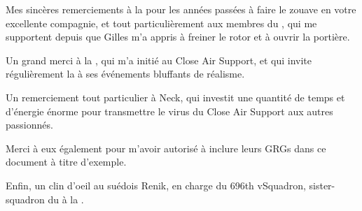 %

\begin{imini}
Mes sincères remerciements à la \thirdwing{} pour les années passées à faire le zouave en votre excellente compagnie, et tout particulièrement aux membres du \rgt{} \inmem{}, qui me supportent depuis que Gilles m'a appris à freiner le rotor et à ouvrir la portière.

Un grand merci à la \onethreetwo{}, qui m'a initié au Close Air Support, et qui invite régulièrement la \thirdwing{} à ses événements bluffants de réalisme.

Un remerciement tout particulier à Neck, qui investit une quantité de temps et d'énergie énorme pour transmettre le virus du Close Air Support aux autres passionnés.

Merci à eux également pour m'avoir autorisé à inclure leurs GRGs dans ce document à titre d'exemple.

Enfin, un clin d'oeil au suédois Renik, en charge du 696th vSquadron, sister-squadron du \rgt à la \onethreetwo.
\end{imini}